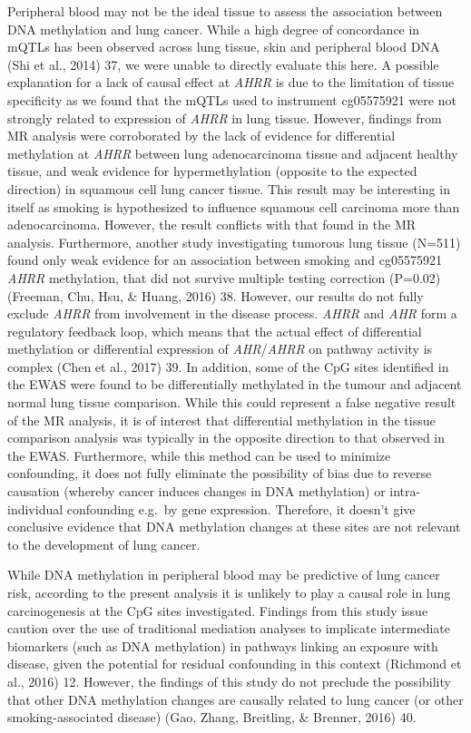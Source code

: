 \documentclass[11pt,twoside]{bristolthesis}
\begin{document}
Peripheral blood may not be the ideal tissue to assess the association between DNA methylation and lung cancer. While a high degree of concordance in mQTLs has been observed across lung tissue, skin and peripheral blood DNA (Shi et al., 2014) 37, we were unable to directly evaluate this here. A possible explanation for a lack of causal effect at \emph{AHRR} is due to the limitation of tissue specificity as we found that the mQTLs used to instrument cg05575921 were not strongly related to expression of \emph{AHRR} in lung tissue. However, findings from MR analysis were corroborated by the lack of evidence for differential methylation at \emph{AHRR} between lung adenocarcinoma tissue and adjacent healthy tissue, and weak evidence for hypermethylation (opposite to the expected direction) in squamous cell lung cancer tissue. This result may be interesting in itself as smoking is hypothesized to influence squamous cell carcinoma more than adenocarcinoma. However, the result conflicts with that found in the MR analysis. Furthermore, another study investigating tumorous lung tissue (N=511) found only weak evidence for an association between smoking and cg05575921 \emph{AHRR} methylation, that did not survive multiple testing correction (P=0.02) (Freeman, Chu, Hsu, \& Huang, 2016) 38. However, our results do not fully exclude \emph{AHRR} from involvement in the disease process. \emph{AHRR} and \emph{AHR} form a regulatory feedback loop, which means that the actual effect of differential methylation or differential expression of \emph{AHR}/\emph{AHRR} on pathway activity is complex (Chen et al., 2017) 39. In addition, some of the CpG sites identified in the EWAS were found to be differentially methylated in the tumour and adjacent normal lung tissue comparison. While this could represent a false negative result of the MR analysis, it is of interest that differential methylation in the tissue comparison analysis was typically in the opposite direction to that observed in the EWAS. Furthermore, while this method can be used to minimize confounding, it does not fully eliminate the possibility of bias due to reverse causation (whereby cancer induces changes in DNA methylation) or intra-individual confounding e.g.~by gene expression. Therefore, it doesn't give conclusive evidence that DNA methylation changes at these sites are not relevant to the development of lung cancer.

While DNA methylation in peripheral blood may be predictive of lung cancer risk, according to the present analysis it is unlikely to play a causal role in lung carcinogenesis at the CpG sites investigated. Findings from this study issue caution over the use of traditional mediation analyses to implicate intermediate biomarkers (such as DNA methylation) in pathways linking an exposure with disease, given the potential for residual confounding in this context (Richmond et al., 2016) 12. However, the findings of this study do not preclude the possibility that other DNA methylation changes are causally related to lung cancer (or other smoking-associated disease) (Gao, Zhang, Breitling, \& Brenner, 2016) 40.
\end{document}
